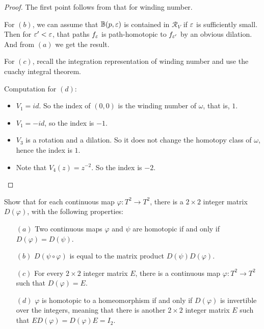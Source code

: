 \begin{proof}
The first point follows from that for winding number.\par
For $(b)$, we can assume that $\mathbb{B}(p,\varepsilon)$ is contained in $\mathcal{R}_V$ if $\varepsilon$ is sufficiently small. Then for $\varepsilon'<\varepsilon$, that paths $f_\varepsilon$ is path-homotopic to $f_{\varepsilon'}$ by an obvious dilation. And from $(a)$ we get the result.\par
For $(c)$, recall the integration representation of winding number and use the cuachy integral theorem.\par
Computation for $(d)$:
\begin{itemize}
\item $V_1=id$. So the index of $(0,0)$ is the winding number of $\omega$, that is, $1$.
\item $V_1=-id$, so the index is $-1$.
\item $V_3$ is a rotation and a dilation. So it does not change the homotopy class of $\omega$, hence the index is $1$.
\item Note that $V_4(z)=z^{-2}$. So the index is $-2$.
\end{itemize}
\end{proof}
\begin{exercise}
Show that for each continuous map $\varphi:T^2\to T^2$, there is a $2\times2$ integer matrix $D(\varphi)$, with the following properties:
\begin{itemize}
\item[$(a)$] Two continuous maps $\varphi$ and $\psi$ are homotopic if and only if $D(\varphi)=D(\psi)$.
\item[$(b)$] $D(\psi\circ\varphi)$ is equal to the matrix product $D(\psi)D(\varphi)$.
\item[$(c)$] For every $2\times2$ integer matrix $E$, there is a continuous map $\varphi:T^2\to T^2$ such that $D(\varphi)=E$.
\item[$(d)$] $\varphi$ is homotopic to a homeomorphism if and only if $D(\varphi)$ is invertible over the integers, meaning that there is another $2\times2$ integer matrix $E$
such that $ED(\varphi)=D(\varphi)E=I_2$.
\end{itemize}

\end{exercise}
